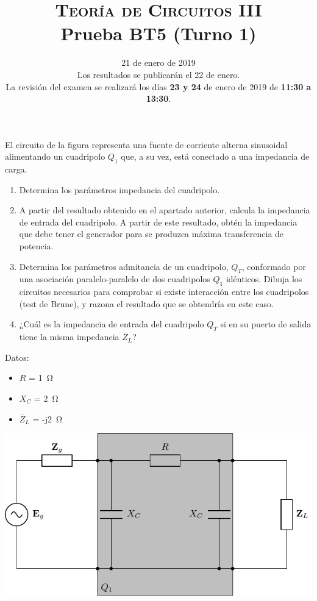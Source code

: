 \documentclass[12pt]{article}
\begin{document}
\title{\textsc{Teoría de Circuitos III}\\Prueba BT5 (Turno 1)}

\date{21 de enero de  2019\\\small{Los resultados se publicarán el 22 de enero.\\La revisión del examen se realizará los días \textbf{23 y 24} de enero de 2019 de \textbf{11:30 a 13:30}.}}

\maketitle

El circuito de la figura representa una fuente de corriente alterna sinusoidal alimentando un cuadripolo $Q_1$ que, a su vez, está conectado a una impedancia de carga. 
\begin{enumerate}
\item Determina los parámetros impedancia del cuadripolo.
\item A partir del resultado obtenido en el apartado anterior, calcula la impedancia de entrada del cuadripolo. A partir de este resultado, obtén la impedancia que debe tener el generador para se produzca máxima transferencia de potencia.
\item Determina los parámetros admitancia de un cuadripolo, $Q_T$, conformado por una asociación paralelo-paralelo de dos cuadripolos $Q_1$ idénticos. Dibuja los circuitos necesarios para comprobar si existe interacción entre los cuadripolos (test de Brune), y razona el resultado que se obtendría en este caso. 
\item ¿Cuál es la impedancia de entrada del cuadripolo $Q_T$ si en su puerto de salida tiene la misma impedancia $\overline{Z}_L$?
\end{enumerate}


\begin{minipage}{0.3\textwidth}
  Datos:
  \begin{itemize}
  \item $R$ = \SI{1}{\ohm}
  \item $X_C$ = \SI{2}{\ohm}
  \item $\overline{Z}_L$ = -j\SI{2}{\ohm}
  \end{itemize}
\end{minipage}
\begin{minipage}{0.7\textwidth}
\includegraphics{figs/E5_circuito.pdf}
\end{minipage}
\end{document}
